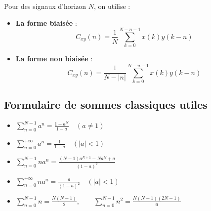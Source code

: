 \begin{definition}
    Pour des signaux d'horizon $N$, on utilise :
    \begin{itemize}
        \item \textbf{La forme biaisée} : 
            \begin{equation}
                C_{xy}(n) = \frac{1}{N} \sum_{k=0}^{N - n - 1} x(k) y(k - n)
            \end{equation}
        \item \textbf{La forme non biaisée} : 
            \begin{equation}
                C_{xy}(n) = \frac{1}{N - |n|} \sum_{k=0}^{N - n - 1} x(k) y(k - n)
            \end{equation}
    \end{itemize}
\end{definition}

\subsection{Formulaire de sommes classiques utiles}

\begin{proposition}
    \begin{itemize}
        \item $\displaystyle \sum_{n=0}^{N-1} a^n = \frac{1 - a^N}{1 - a} \quad (a \neq 1)$
        \item $\displaystyle \sum_{n=0}^{+\infty} a^n = \frac{1}{1 - a} \quad (|a| < 1)$
        \item $\displaystyle \sum_{n=0}^{N-1} n a^n = \frac{(N-1)a^{N+1} - N a^N + a}{(1 - a)^2}$
        \item $\displaystyle \sum_{n=0}^{+\infty} n a^n = \frac{a}{(1 - a)^2} \quad (|a| < 1)$
        \item $\displaystyle \sum_{n=0}^{N-1} n = \frac{N(N-1)}{2}, \qquad \sum_{n=0}^{N-1} n^2 = \frac{N(N-1)(2N-1)}{6}$
    \end{itemize}
\end{proposition}